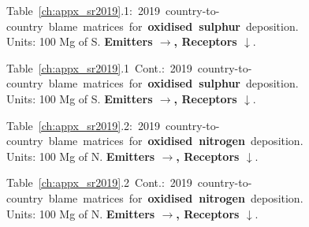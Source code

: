 
\cleartoleftpage

\newlength{\previousparindent}
\setlength{\previousparindent}{\parindent}
\setlength{\parindent}{0pt}
\newlength{\previousheadsep}
\setlength{\previousheadsep}{\headsep}

\newlength{\myheadsep}
\setlength{\myheadsep}{0.5\headsep}
\setlength{\headsep}{\myheadsep}

\newlength{\mywidth}
\newlength{\myheight}
\newlength{\myenlarge}

\setlength{\mywidth}{1.1\textwidth}
\setlength{\myheight}{1.00\textheight}
\setlength{\myenlarge}{8\baselineskip}



\footnotesize{\mbox{Table \ref{ch:appx_sr2019}.1: 2019
    country-to-country blame matrices for \textbf{oxidised sulphur}
    deposition.}\\ Units: 100 Mg of S. \textbf{Emitters
      $\rightarrow$, Receptors $\downarrow$}. }\\[\baselineskip]\enlargethispage{\myenlarge} \hspace{-0.5cm} 
\centerline{}\clearpage
\footnotesize{\mbox{Table \ref{ch:appx_sr2019}.1 Cont.: 2019
    country-to-country blame matrices for \textbf{oxidised sulphur}
    deposition.}\\ Units: 100 Mg of S. \textbf{Emitters
      $\rightarrow$, Receptors $\downarrow$}. }\\[\baselineskip]\enlargethispage{\myenlarge} \hspace{-0.5cm} 
\centerline{}\clearpage

\footnotesize{\mbox{Table \ref{ch:appx_sr2019}.2: 2019 country-to-country blame matrices for \textbf{oxidised nitrogen} deposition.}\\ Units: 100 Mg of N. \textbf{Emitters $\rightarrow$, Receptors $\downarrow$}. }\\[\baselineskip]\enlargethispage{\myenlarge} \hspace{-0.5cm} 
\centerline{}\clearpage
\footnotesize{\mbox{Table \ref{ch:appx_sr2019}.2 Cont.: 2019 country-to-country blame matrices for \textbf{oxidised nitrogen} deposition.}\\ Units: 100 Mg of N. \textbf{Emitters $\rightarrow$, Receptors $\downarrow$}. }\\[\baselineskip]\enlargethispage{\myenlarge} \hspace{-0.5cm} 
\centerline{}\clearpage

